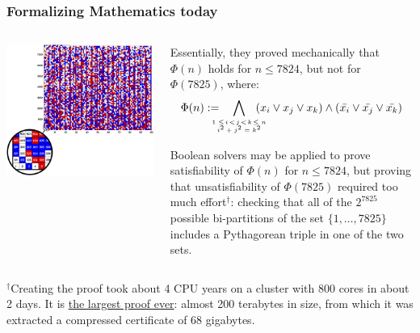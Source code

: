 \documentclass[10pt]{beamer}
\begin{document}
\begin{frame}\frametitle{Formalizing Mathematics today}


  \begin{columns}
\begin{column}{0.35\textwidth}
\includegraphics[scale=.24]{figs/PitagoreanTriples.png}
\end{column}
\begin{column}{0.6\textwidth}
 \small{ Essentially, they proved mechanically that $\Phi(n)$ holds for $n\leq
7824$, but not for $\Phi(7825)$, where:
\[\Phi(n) := \hspace{-5mm}\bigwedge_{\tiny\begin{array}{c}1\leq\! i\!<\!j\!<\!k\! \leq n\\ i^2+j^2 = k^2\end{array}}\hspace{-5mm} (x_i\vee
  x_j\vee x_k) \wedge  (\bar{x_i}\vee
  \bar{x_j}\vee \bar{x_k}) \]

Boolean solvers may be applied to prove satisfiability of
$\Phi(n)$ for $n\leq 7824$, but proving that unsatisfiability of
$\Phi(7825)$ required too much effort$^{\dag}$: checking that all of the
$2^{7825}$ possible bi-partitions of the set $\{1,\ldots,7825\}$
includes a Pythagorean triple in one of the two sets.   
}
  \end{column}
\end{columns}

\vspace{3mm}
\noindent$\mbox{}^\dag$\footnotesize{Creating the proof took
  about 4 CPU years on a cluster with 800 cores in about 2 days. It is
  \href{https://doi.org/10.1038/nature.2016.19990}{\color{blue}the largest proof ever}: almost 200 terabytes in size, from which it
  was extracted a compressed certificate of 68 gigabytes.}
\end{frame}
\end{document}
